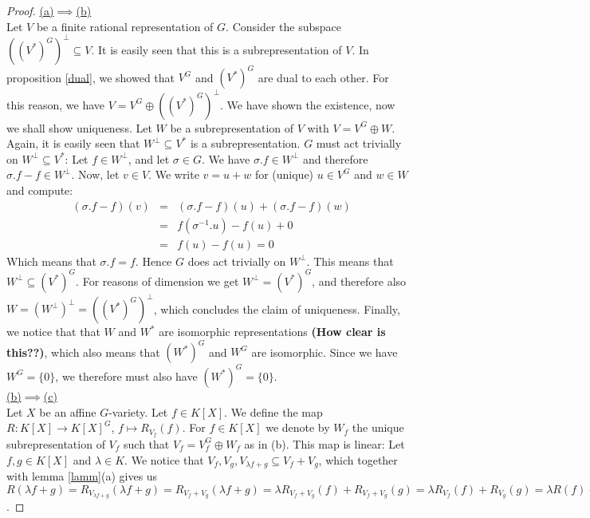 \begin{proof}
  \hfill \break
  \underline{(a)$\implies$(b)}\\
  Let $V$ be a finite rational representation of $G$.
  Consider the subspace $ ((V^\ast)^G)^\bot \subseteq V $.
  It is easily seen that this is a subrepresentation of $V$.
  In proposition \ref{dual}, we showed that $V^G$ and $(V^\ast)^G$ are dual to each other.
  For this reason, we have $V = V^G \oplus ((V^\ast)^G)^\bot $.
  We have shown the existence, now we shall show uniqueness.
  Let $W$ be a subrepresentation of $V$ with $V = V^G \oplus W $.
  Again, it is easily seen that $W^\bot \subseteq V^\ast$ is a subrepresentation.
  $G$ must act trivially on $W^\bot \subseteq V^\ast$:
  Let $f \in W^\bot$, and let $\sigma \in G$.
  We have $\sigma.f \in W^\bot$ and therefore $\sigma.f - f \in W^\bot$.
  Now, let $v \in V$.
  We write $v = u + w$ for (unique) $u \in V^G$ and $w \in W$ and compute:
  \begin{equation}
    \begin{aligned}
      &(\sigma.f -f)(v)&=&(\sigma.f -f)(u) + (\sigma.f -f)(w)\\
      &&=&f(\sigma^{-1}.u) - f(u) + 0\\
      &&=&f(u)-f(u) = 0
    \end{aligned}
  \end{equation}
  Which means that $\sigma.f = f$.
  Hence $G$ does act trivially on $W^\bot$.
  This means that $W^\bot \subseteq (V^\ast)^G$.
  For reasons of dimension we get $W^\bot = (V^\ast)^G$, and therefore also $W = (W^\bot)^\bot = ((V^\ast)^G)^\bot$, which concludes the claim of uniqueness.
  Finally, we notice that that $W$ and $W^\ast$ are isomorphic representations \textbf{(How clear is this??)}, which also means that $(W^\ast)^G$ and $W^G$ are isomorphic.
  Since we have $W^G = \{0\}$, we therefore must also have $(W^\ast)^G = \{0\}$.\\
  \underline{(b)$\implies$(c)}\\
  Let $X$ be an affine $G$-variety.
  Let $f \in K[X]$.
  We define the map $R \colon K[X] \longrightarrow K[X]^G $, $ f \mapsto R_{V_f}(f)$.
  For $f \in K[X]$ we denote by $W_f$ the unique subrepresentation of $V_f$ such that $V_f = V_f^G \oplus W_f$ as in (b).
  This map is linear:
  Let $f,g \in K[X]$ and $\lambda \in K$.
  We notice that $V_f,V_g,V_{\lambda f + g} \subseteq V_f + V_g$, which together with lemma \ref{lamm}(a) gives us $R(\lambda f +g) = R_{V_{\lambda f +g}}(\lambda f+g) = R_{V_f +V_g}(\lambda f+g) = \lambda R_{V_f + V_g} (f) + R_{V_f + V_g}(g) = \lambda R_{V_f} (f) + R_{V_g}(g) = \lambda R(f) + R(g)$.

\end{proof}
